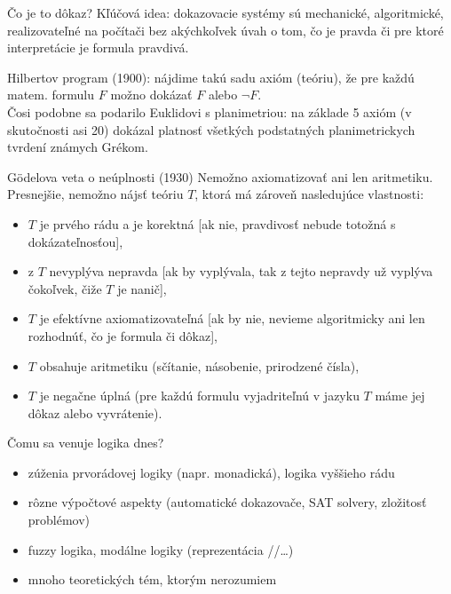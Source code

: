\documentclass[12pt]{beamer}
\theoremstyle{definition}
\begin{document}
\begin{frame}{Čo je to dôkaz?}
Kľúčová idea: dokazovacie systémy sú mechanické, algoritmické,
realizovateľné na počítači bez akýchkoľvek úvah o tom,
čo je pravda či pre ktoré interpretácie je formula pravdivá.
\end{frame}

\begin{frame}
Hilbertov program (1900):
nájdime takú sadu axióm (teóriu), že pre každú matem. formulu $F$ možno dokázať $F$ alebo $\lnot F$.\\[5mm]
Čosi podobne sa podarilo Euklidovi s planimetriou: na základe 5 axióm (v skutočnosti asi 20)
dokázal platnosť všetkých podstatných planimetrickych tvrdení známych Grékom.
\end{frame}

\begin{frame}{G\"odelova veta o neúplnosti (1930)}
Nemožno axiomatizovať ani len aritmetiku.
Presnejšie, nemožno nájsť teóriu $T$, ktorá má zároveň nasledujúce vlastnosti:
\begin{itemize}
\item $T$ je prvého rádu a je korektná [ak nie, pravdivosť nebude totožná s dokázateľnosťou],
\item z $T$ nevyplýva nepravda [ak by vyplývala, tak z tejto nepravdy už vyplýva čokoľvek, čiže $T$ je nanič],
\item $T$ je efektívne axiomatizovateľná [ak by nie, nevieme algoritmicky ani len rozhodnúť, čo je formula či dôkaz],
\item $T$ obsahuje aritmetiku (sčítanie, násobenie, prirodzené čísla),
\item $T$ je negačne úplná (pre každú formulu vyjadriteľnú v jazyku $T$ máme jej dôkaz alebo vyvrátenie).
\end{itemize}
\end{frame}

\begin{frame}{Čomu sa venuje logika dnes?}
\begin{itemize}
\item zúženia prvorádovej logiky (napr. monadická), logika vyššieho rádu
\item rôzne výpočtové aspekty (automatické dokazovače, SAT solvery, zložitosť problémov)
\item fuzzy logika, modálne logiky (reprezentácia //\dots)
\item mnoho teoretických tém, ktorým nerozumiem
\end{itemize}
\end{frame}
\end{document}
